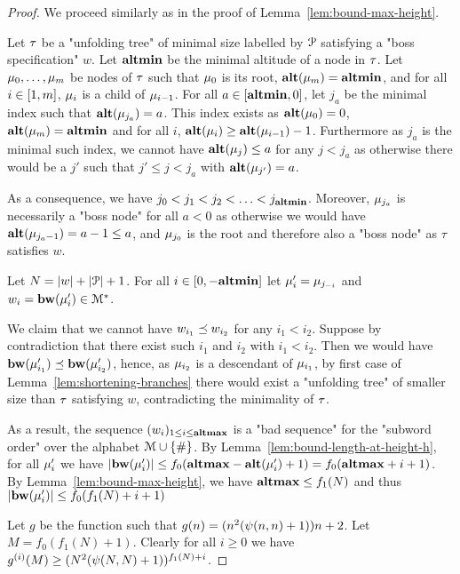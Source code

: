 \begin{proof}
	We proceed similarly as in the proof of Lemma~\ref{lem:bound-max-height}. 
	
	Let $\tau$ be a "unfolding tree" of minimal size labelled by $\mathcal{P}$ satisfying a "boss specification" $w$. Let $\mathbf{altmin}$ be the minimal altitude of a node in $\tau$. Let $\mu_0, \ldots, \mu_m$ be nodes of $\tau$ such that $\mu_0$ is its root, $\mathbf{alt}(\mu_m) = \mathbf{altmin}$, and for all $i\in [1,m]$, $\mu_i$ is a child of $\mu_{i-1}$.
	For all $a \in [\mathbf{altmin},0]$, let $j_a$ be the minimal index such that $\mathbf{alt}(\mu_{j_a}) = a$. This index exists as $\mathbf{alt}(\mu_0) = 0$, $\mathbf{alt}(\mu_m) = \mathbf{altmin}$ and for all $i$, $\mathbf{alt}(\mu_{i}) \geq \mathbf{alt}(\mu_{i-1})-1$.
	Furthermore as $j_a$ is the minimal such index, we cannot have $\mathbf{alt}(\mu_j) \leq a$ for any $j < j_a$ as otherwise there would be a $j'$ such that $j' \leq j < j_a$ with $\mathbf{alt}(\mu_{j'}) = a$.
	
	As a consequence, we have $j_0 < j_1 < j_2 < \ldots < j_{\mathbf{altmin}}$. Moreover, $\mu_{j_a}$ is necessarily a "boss node" for all $a<0$ as otherwise we would have $\mathbf{alt}(\mu_{j_a-1}) = a-1 \leq a$, and $\mu_{j_0}$ is the root and therefore also a "boss node" as $\tau$ satisfies $w$.
	
	Let $N = |w| + |\mathcal{P}|+1$. For all $i \in [0,-\mathbf{altmin}]$ let $\mu'_i = \mu_{j_{-i}}$ and $w_i = \mathbf{bw}(\mu'_{i}) \in \mathcal{M}^*$.
	
	We claim that we cannot have $w_{i_1}\preceq w_{i_2}$ for any  $i_1< i_2$.
	Suppose by contradiction that there exist such $i_1$ and $i_2$ with $i_1 < i_2$. Then we would have $\mathbf{bw}(\mu'_{i_1}) \preceq \mathbf{bw}(\mu'_{i_2})$, hence, as $\mu_{i_2}$ is a descendant of $\mu_{i_1}$, by first case of Lemma~\ref{lem:shortening-branches} there would exist a "unfolding tree" of smaller size than $\tau$ satisfying $w$, contradicting the minimality of $\tau$.
	
	As a result, the sequence $(w_i)_{1\leq i \leq \mathbf{altmax}}$ is a "bad sequence" for the "subword order" over the alphabet $\mathcal{M}\cup\{\#\}$.
	By Lemma~\ref{lem:bound-length-at-height-h}, for all $\mu'_i$ we have $|\mathbf{bw}(\mu'_i)| \leq f_0(\mathbf{altmax} - \mathbf{alt}(\mu'_i)+1) = f_0(\mathbf{altmax} +i+1)$.
	By Lemma~\ref{lem:bound-max-height}, we have $\mathbf{altmax} \leq f_1(N)$ and thus $|\mathbf{bw}(\mu'_i)| \leq  f_0(f_1(N) +i+1)$
	
	Let $g$ be the function such that $g(n) = (n^2(\psi(n,n)+1))n+2$. 
	Let $M = f_0(f_1(N)+1)$. Clearly for all $i\geq 0$ we have $g^{(i)}(M) \geq (N^2(\psi(N,N)+1))^{f_1(N) + i}$.
	

\end{proof}
